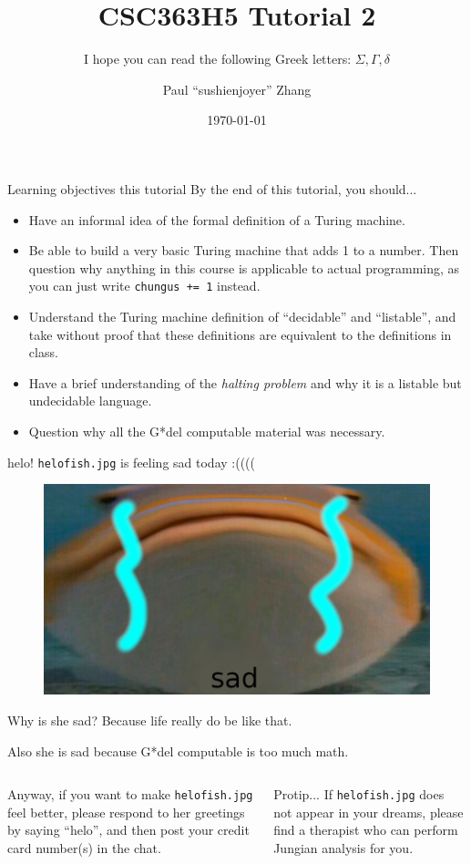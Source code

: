 \documentclass{beamer}
\title{CSC363H5 Tutorial 2}
\subtitle{I hope you can read the following Greek letters: $\Sigma, \Gamma, \delta$}
\date{\today}
\author{Paul ``sushi{\textunderscore}enjoyer'' Zhang}
\institute{University of Chungi}
\begin{document}
\maketitle

\begin{frame}{Learning objectives this tutorial}
By the end of this tutorial, you should...
\begin{itemize}
\item Have an informal idea of the formal definition of a Turing machine.
\item Be able to build a very basic Turing machine that adds 1 to a number. Then question why anything in this course is applicable to actual programming, as you can just write \texttt{chungus += 1} instead.
\item Understand the Turing machine definition of ``decidable'' and ``listable'', and take without proof that these definitions are equivalent to the definitions in class.
\item Have a brief understanding of the \textit{halting problem} and why it is a listable but undecidable language.
\item Question why all the G*del computable material was necessary.
\end{itemize}
\end{frame}

\begin{frame}{helo!}
\texttt{helo{\textunderscore}fish.jpg} is feeling sad today :((((
\begin{figure}
\includegraphics[scale=0.2]{img/helo_fish_sad.jpg}
\end{figure}
Why is she sad? Because life really do be like that. 

Also she is sad because G*del computable is too much math.

  \begin{columns}
    Anyway, if you want to make \texttt{helo{\textunderscore}fish.jpg} feel better, please respond to her greetings by saying ``helo'', and then post your credit card number(s) in the chat.

      \begin{block}{Protip...}
         If \texttt{helo{\textunderscore}fish.jpg} does not appear in your dreams, please find a therapist who can perform Jungian analysis for you.
      \end{block}
  \end{columns}
  
\end{frame}
\end{document}
